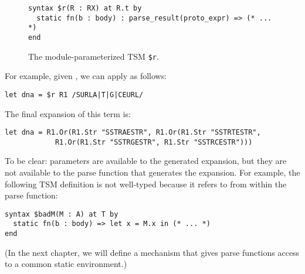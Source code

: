 \begin{figure}[h]
\begin{lstlisting}
syntax $r(R : RX) at R.t by 
  static fn(b : body) : parse_result(proto_expr) => (* ... *)
end
\end{lstlisting}
\vspace{-5px}
\caption{The module-parameterized TSM \texttt{\$r}.}
\label{fig:param-tsm-r}
\end{figure}
\noindent
For example, given , we can apply  as follows:
\begin{lstlisting}[numbers=none]
let dna = $r R1 /SURLA|T|G|CEURL/
\end{lstlisting}
The final expansion of this term is:
\begin{lstlisting}[numbers=none]
let dna = R1.Or(R1.Str "SSTRAESTR", R1.Or(R1.Str "SSTRTESTR", 
	        R1.Or(R1.Str "SSTRGESTR", R1.Str "SSTRCESTR")))
\end{lstlisting}

To be clear: parameters are available to the generated expansion, but they are not available to the parse function that generates the expansion. For example, the following TSM definition is not well-typed because it refers to  from within the parse function:
\begin{lstlisting}[numbers=none]
syntax $badM(M : A) at T by 
  static fn(b : body) => let x = M.x in (* ... *)
end
\end{lstlisting}
(In the next chapter, we will define a mechanism that gives parse functions access to a common static environment.)


